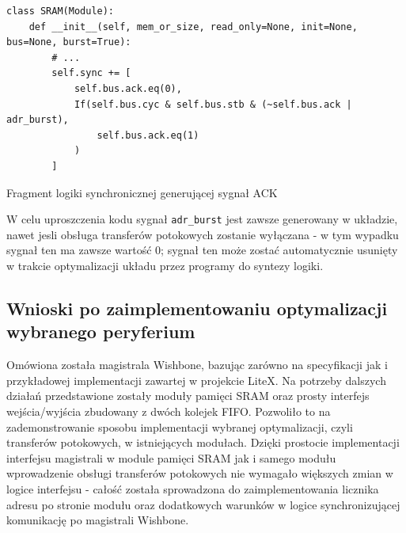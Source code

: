 \begin{listing}[H]
\begin{verbatim}
class SRAM(Module):
    def __init__(self, mem_or_size, read_only=None, init=None, bus=None, burst=True):
        # ...
        self.sync += [
            self.bus.ack.eq(0),
            If(self.bus.cyc & self.bus.stb & (~self.bus.ack | adr_burst),
                self.bus.ack.eq(1)
            )
        ]
\end{verbatim}
\caption{Fragment logiki synchronicznej generującej sygnał ACK}
\label{lst:impl-sram-ack}
\end{listing}

W celu uproszczenia kodu sygnał \texttt{adr_burst} jest zawsze generowany w układzie, nawet jesli obsługa transferów potokowych zostanie wyłączana - w tym wypadku sygnał ten ma zawsze wartość $0$; sygnał ten może zostać automatycznie usunięty w trakcie optymalizacji układu przez programy do syntezy logiki.

\subsection{Wnioski po zaimplementowaniu optymalizacji wybranego peryferium}

Omówiona została magistrala Wishbone, bazując zarówno na specyfikacji jak i przykładowej implementacji zawartej w projekcie LiteX.
Na potrzeby dalszych działań przedstawione zostały moduły pamięci SRAM oraz prosty interfejs wejścia/wyjścia zbudowany z dwóch kolejek FIFO. Pozwoliło to na zademonstrowanie sposobu implementacji wybranej optymalizacji, czyli transferów potokowych, w istniejących modułach.
Dzięki prostocie implementacji interfejsu magistrali w module pamięci SRAM jak i samego modułu wprowadzenie obsługi transferów potokowych nie wymagało większych zmian w logice interfejsu - całość została sprowadzona do zaimplementowania licznika adresu po stronie modułu oraz dodatkowych warunków w logice synchronizującej komunikację po magistrali Wishbone.

